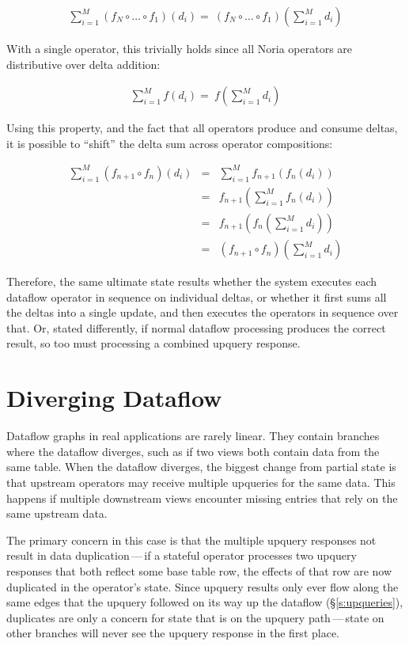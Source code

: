 \begin{eqnarray*}
  \sum^M_{i=1}\left(f_N \circ \dots \circ f_1\right)\left(d_i\right) = \
  \left(f_N \circ \dots \circ f_1\right)\left(\sum^M_{i=1}d_i\right)
\end{eqnarray*}

With a single operator, this trivially holds since all Noria operators are
distributive over delta addition:

\begin{eqnarray*}
  \sum^M_{i=1}f\left(d_i\right) = \
  f\left(\sum^M_{i=1}d_i\right)
\end{eqnarray*}

Using this property, and the fact that all operators produce and consume deltas,
it is possible to ``shift'' the delta sum across operator compositions:

\begin{eqnarray*}
  \sum^M_{i=1}\left(f_{n+1} \circ f_n\right)\left(d_i\right) &=& \sum^M_{i=1}f_{n+1}\left(f_n\left(d_i\right)\right) \\
  &=& f_{n+1}\left(\sum^M_{i=1}f_n\left(d_i\right)\right) \\
  &=& f_{n+1}\left(f_n\left(\sum^M_{i=1}d_i\right)\right) \\
  &=& \left(f_{n+1} \circ f_n\right)\left(\sum^M_{i=1}d_i\right)
\end{eqnarray*}

Therefore, the same ultimate state results whether the system executes each
dataflow operator in sequence on individual deltas, or whether it first sums
all the deltas into a single update, and then executes the operators in sequence
over that. Or, stated differently, if normal dataflow processing produces the
correct result, so too must processing a combined upquery response.

\section{Diverging Dataflow}

Dataflow graphs in real applications are rarely linear. They contain branches
where the dataflow diverges, such as if two views both contain data from the
same table. When the dataflow diverges, the biggest change from partial state is
that upstream operators may receive multiple upqueries for the same data. This
happens if multiple downstream views encounter missing entries that rely on the
same upstream data.

The primary concern in this case is that the multiple upquery responses not
result in data duplication\,---\,if a stateful operator processes two upquery
responses that both reflect some base table row, the effects of that row are now
duplicated in the operator's state. Since upquery results only ever flow along
the same edges that the upquery followed on its way up the dataflow
(\S\ref{s:upqueries}), duplicates are only a concern for state that is on the
upquery path\,---\,state on other branches will never see the upquery response
in the first place.

